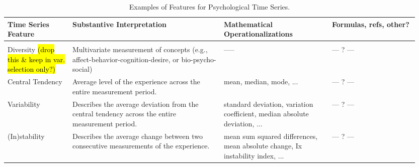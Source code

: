 \begin{sidewaystable}
    \centering
    \caption{Examples of Features for Psychological Time Series.}
    \label{tab:esmFeatures} 
    \begin{tabular}{
    >{\raggedright\arraybackslash}p{0.15\linewidth} 
    >{\raggedright\arraybackslash}p{0.35\linewidth} 
    >{\raggedright\arraybackslash}p{0.25\linewidth} 
    >{\raggedright\arraybackslash}p{0.20\linewidth}
    }
        \hline 
        Time Series Feature & Substantive Interpretation & Mathematical Operationalizations & Formulas, refs, other? \\ 
        \hline \\ [-0.5em]
        Diversity \newline \hl{(drop this \& keep in var. selection only?)} & 
        Multivariate measurement of concepts (e.g., affect-behavior-cognition-desire, or bio-psycho-social) \linebreak & 
        -----\linebreak  & 
        {\centering --- ? ---\par} \\
        
        Central Tendency \linebreak & 
        Average level of the experience across the entire measurement period. \linebreak & 
        mean, \linebreak median, \linebreak mode, ... \linebreak  & 
        {\centering --- ? ---\par} \\ 
        
        Variability & 
        Describes the average deviation from the central tendency across the entire measurement period. \linebreak & 
        standard deviation, \linebreak variation coefficient, \linebreak median absolute deviation, ... \linebreak & 
        {\centering --- ? ---\par} \\ 
        
        (In)stability & 
        Describes the average change between two consecutive measurements of the experience. \linebreak & 
        mean sum squared differences, \linebreak mean absolute change, \linebreak Ix instability index, ... \linebreak & 
        {\centering --- ? ---\par} \\ 
        

\end{tabular}
\end{sidewaystable}
